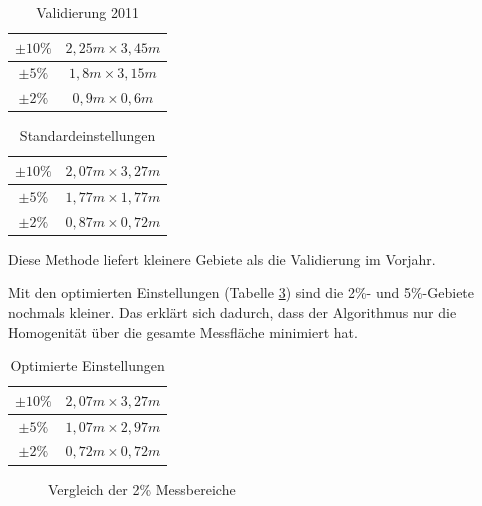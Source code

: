 \documentclass[a4paper,bibtotoc,oneside]{scrbook}
\begin{document}
\begin{table}[htbp]
\centering
\begin{tabular}{ | c | c |}\hline
$\pm 10\%$ & $2,25m \times 3,45m$  \\ \hline
$\pm 5\%$ & $1,8m \times 3,15m$    \\ \hline
$\pm 2\%$ & $0,9m \times 0,6m$     \\ \hline
\end{tabular}
\caption{Validierung 2011}\label{Tab11}
\end{table}


\begin{table}[htbp]
\centering
\begin{tabular}{ | c | c |}\hline
$\pm 10\%$ & $2,07m \times 3,27m$  \\ \hline
$\pm 5\%$ & $1,77m \times 1,77m$    \\ \hline
$\pm 2\%$ & $0,87m \times 0,72m$     \\ \hline
\end{tabular}
\caption{Standardeinstellungen}\label{Tabstd}
\end{table}
Diese Methode liefert kleinere Gebiete als die Validierung im Vorjahr.

Mit den optimierten Einstellungen (Tabelle \ref{Tabopt}) sind die 2\%- und 5\%-Gebiete nochmals kleiner. Das erklärt sich dadurch, dass der Algorithmus nur die Homogenität über die gesamte Messfläche minimiert hat.
\begin{table}[htbp]
\centering
\begin{tabular}{ | c | c |}\hline
$\pm 10\%$ & $2,07m \times 3,27m$  \\ \hline
$\pm 5\%$ & $1,07m \times 2,97m$    \\ \hline
$\pm 2\%$ & $0,72m \times 0,72m$     \\ \hline
\end{tabular}
\caption{Optimierte Einstellungen}\label{Tabopt}
\end{table}

\FloatBarrier

\begin{figure}
\caption{Vergleich der 2\% Messbereiche}
\label{zwei}
\end{figure} 
\end{document}
